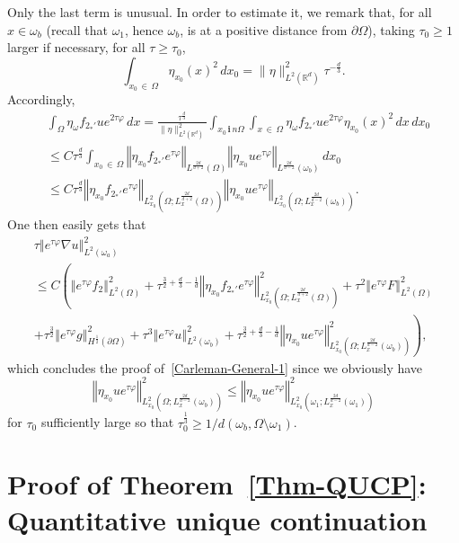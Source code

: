 \documentclass[10pt]{amsart}
\theoremstyle{definition}\newtheorem{defi}[theo]{Definition}\newtheorem{rema}[theo]{Remark}\newtheorem{exam}[theo]{Example}\newtheorem{exem}[theo]{Example}\newtheorem{nota}[theo]{Notation}
\newcommand*\R{\mathbb{R}}
\renewcommand{\i}{\mathbf{i}}
\newcommand{\norm}[1]{\left\Vert#1\right\Vert}
\renewcommand{\leq}{\leqslant}
\renewcommand{\geq}{\geqslant}
\begin{document}
Only the last term is unusual. In order to estimate it, we remark that, for all $x \in \omega_b$ (recall that $\omega_{1}$, hence $\omega_b$, is at a positive distance from $\partial \Omega$), taking $\tau_0\geq 1$ larger if necessary, for all $\tau \geq \tau_0$,
\[
\int_{x_0\, \in\, \Omega} \eta_{x_0}(x)^2 \, dx_0 = \| \eta\|_{L^2\left(\R^d\right)}^2 \tau^{-\frac{d}{3}}.
\]
Accordingly,
\begin{align*}
& \int_{\Omega} \eta_\omega f_{2_*'} u e^{2 \tau \varphi} \, dx =
\frac{\tau^{\frac{d}{3}}}{\| \eta\|_{L^2(\R^d)}^2} \int_{ x_0\, \i\,n \Omega} \int_{x\, \in\, \Omega} \eta_\omega f_{2_*'} u e^{2 \tau \varphi} \eta_{x_0}(x)^2 \, dx \, dx_0
\\
&\leq C \tau^{\frac{d}{3}} \int_{x_0\,\in\, \Omega} \norm{\eta_{x_0} f_{2_*'}e^{\tau \varphi}}_{L^{\frac{2d}{d+2}}(\Omega)}
\norm{ \eta_{x_0} u e^{\tau \varphi}}_{L^{\frac{2d}{d-2}}(\omega_b)} \, dx_0
\\
&\leq C \tau^{\frac{d}{3}} \norm{\eta_{x_0} f_{2_*'}e^{\tau \varphi}}_{L^2_{x_0}\left(\Omega; L^{\frac{2d}{d+2}}_x(\Omega)\right)} \norm{\eta_{x_0} u e^{\tau \varphi}}_{L^2_{x_0}\left(\Omega; L^{\frac{2d}{d-2}}_x(\omega_b)\right)}.
\end{align*}
One then easily gets that
\begin{multline*}
\tau \norm{ e^{\tau \varphi} \nabla u}_{L^2(\omega_a)}^2\\
 \leq  C  \left( 
\norm{e^{\tau \varphi} f_2 }_{L^2(\Omega)}^2\! +
\tau^{\frac{3}{2}+\frac{d}{3}-\frac{1}{d}} \norm{\eta_{x_0} f_{2_*'}e^{\tau \varphi}}_{L^2_{x_0}(\Omega; L^{\frac{2d}{d+2}}_x(\Omega))}^2 + 
\tau^2 \norm{e^{\tau \varphi} F }_{L^2(\Omega)}^2
\right.
\\
\left. +
\tau^{\frac{3}{2}} \norm{ e^{\tau \varphi} g }_{H^{\frac{1}{2}}(\partial \Omega)}^2 +
\tau^{3} \norm{ e^{\tau \varphi} u}_{L^2(\omega_b)}^2 +
\tau^{\frac{3}{2}+\frac{d}{3}-\frac{1}{d}} \norm{ \eta_{x_0} u e^{\tau \varphi}}_{L^2_{x_0}\left(\Omega; L^{\frac{2d}{d-2}}_x(\omega_b)\right)}^2
\right),
\end{multline*}
which concludes the proof of~\eqref{Carleman-General-1} since we obviously have
\[
\norm{ \eta_{x_0} u e^{\tau \varphi}}_{L^2_{x_0}\left(\Omega; L^{\frac{2d}{d-2}}_x(\omega_b)\right)}^2
\leq
\norm{\eta_{x_0} u e^{\tau \varphi}}_{L^2_{x_0}\left(\omega_1; L^{\frac{2d}{d-2}}_x(\omega_1)\right)}^2
\]
for $\tau_0$ sufficiently large so that $\tau_0^{\frac{1}{3}} \geq 1/ d(\omega_b, \Omega \setminus \omega_1)$.


\section{Proof of Theorem~\ref{Thm-QUCP}: Quantitative unique continuation} \label{Sec-Proof-Thm-QUCP}
\end{document}
